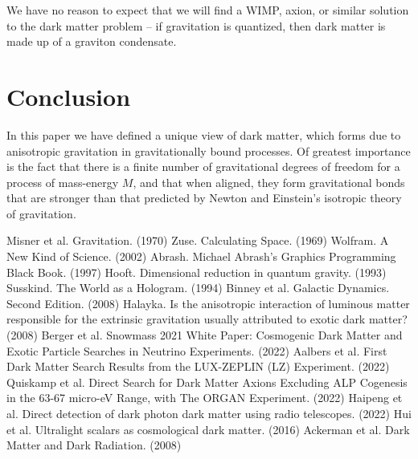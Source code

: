 \documentclass[12pt]{article}
\begin{document}
We have no reason to expect that we will find a WIMP, axion, or similar solution \cite{berger, aalbers, quiskamp, haipeng, hui, ackerman} to the dark matter problem -- if gravitation is quantized, then dark matter is made up of a graviton condensate.





\section{Conclusion}

In this paper we have defined a unique view of dark matter, which forms due to anisotropic gravitation in gravitationally bound processes.
Of greatest importance is the fact that there is a finite number of gravitational degrees of freedom for a process of mass-energy $M$, and that when aligned, they form gravitational bonds that are stronger than that predicted by Newton and Einstein's isotropic theory of gravitation.








\begin{thebibliography}{9}
 Misner et al. Gravitation. (1970)
 Zuse. Calculating Space. (1969)
 Wolfram. A New Kind of Science. (2002)
 Abrash. Michael Abrash's Graphics Programming Black Book. (1997)
 Hooft. Dimensional reduction in quantum gravity. (1993)
 Susskind. The World as a Hologram. (1994)
 Binney et al. Galactic Dynamics. Second Edition. (2008)
 Halayka. Is the anisotropic interaction of luminous matter responsible for the extrinsic gravitation usually attributed to exotic dark matter? (2008)
 Berger et al. Snowmass 2021 White Paper: Cosmogenic Dark Matter and Exotic Particle Searches in Neutrino Experiments. (2022)
 Aalbers et al. First Dark Matter Search Results from the LUX-ZEPLIN (LZ) Experiment. (2022)
 Quiskamp et al. Direct Search for Dark Matter Axions Excluding ALP Cogenesis in the 63-67 micro-eV Range, with The ORGAN Experiment. (2022)
 Haipeng et al. Direct detection of dark photon dark matter using radio telescopes. (2022)
 Hui et al. Ultralight scalars as cosmological dark matter. (2016)
 Ackerman et al. Dark Matter and Dark Radiation. (2008)
\end{thebibliography}
\end{document}
